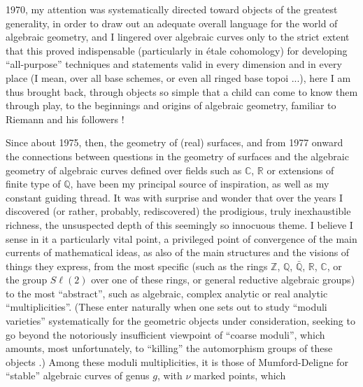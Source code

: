 
1970, my attention was systematically directed toward objects
of the greatest generality, in order to draw out an adequate overall language
for the world of algebraic geometry, and I lingered
over algebraic curves only to the strict extent that this proved
indispensable (particularly in étale cohomology) for developing
``all-purpose'' techniques and statements valid in every dimension
and in every place (I mean, over all base schemes, or even
all ringed base topoi ...), here I am thus brought back, through
objects so simple that a child can come to know them through play,
to the beginnings and origins of algebraic geometry, familiar to Riemann
and his followers !

Since about 1975, then, the geometry of (real)
surfaces, and from 1977 onward the connections between questions in
the geometry of surfaces and the algebraic geometry of algebraic curves
defined over fields such as $\mathbb{C}$, $\mathbb{R}$ or extensions of finite
type of $\mathbb{Q}$, have been my principal source of inspiration, as well
as my constant guiding thread. It was with surprise and wonder
that over the years I discovered (or rather, probably,
rediscovered) the prodigious, truly inexhaustible richness, the
unsuspected depth of this seemingly so innocuous theme. I believe
I sense in it a particularly vital point, a privileged point of convergence
of the main currents of mathematical ideas, as also
of the main structures and the visions of things they express,
from the most specific (such as the rings $\mathbb{Z}$, $\mathbb{Q}$, $\bar{\mathbb{Q}}$, $\mathbb{R}$, $\mathbb{C}$,
or the group $S\ell(2)$ over one of these rings, or general reductive
algebraic groups) to the most ``abstract'', such as algebraic,
complex analytic or real analytic ``multiplicities''.
(These enter naturally when one sets out to study
``moduli varieties'' systematically for the geometric objects
under consideration, seeking to go beyond the notoriously insufficient
viewpoint of ``coarse moduli'', which amounts, most unfortunately,
to ``killing'' the automorphism groups of these objects .) Among these
moduli multiplicities, it is those of Mumford-Deligne for
``stable'' algebraic curves of genus $g$, with $\nu$ marked points, which


